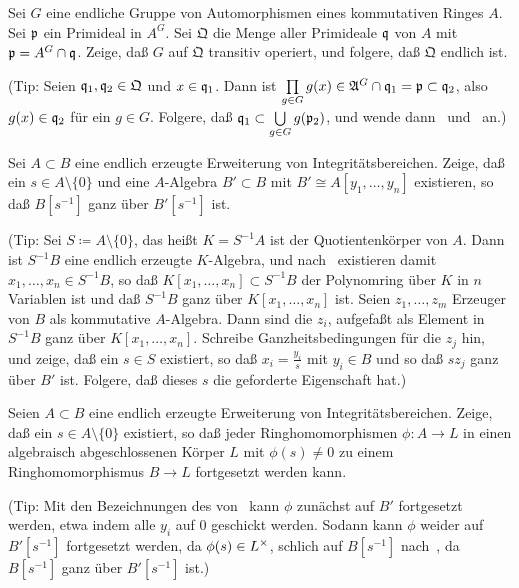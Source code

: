 \begin{exercise}
	Sei \(G\) eine endliche Gruppe von Automorphismen eines kommutativen Ringes
	\(A\). Sei \(\mathfrak{p}\) ein Primideal in \(A^G\). Sei \(\mathfrak Q\) die
	Menge aller Primideale \(\mathfrak{q}\) von \(A\) mit \(\mathfrak{p} = A^G \cap
	\mathfrak{q}\). Zeige, daß \(G\) auf \(\mathfrak Q\) transitiv operiert, und
	folgere, daß \(\mathfrak Q\) endlich ist.

	(Tip: Seien \(\mathfrak{q}_1, \mathfrak{q}_2 \in \mathfrak Q\) und \(x \in \mathfrak{q}_1\). Dann ist \(\prod\limits_{g \in G} g(x) \in \mathfrak{A}^G \cap \mathfrak{q}_1
	= \mathfrak{p} \subset \mathfrak{q}_2\), also \(g(x) \in \mathfrak{q}_2\) für ein
	\(g \in G\). Folgere, daß \(\mathfrak{q}_1 \subset \bigcup\limits_{g \in G}
	g(\mathfrak{p}_2)\), und wende dann~
	und~ an.)
\end{exercise}

\begin{exercise}
	\label{exer:global_noether_norm}
	Sei \(A \subset B\) eine endlich erzeugte Erweiterung von
	Integritätsbereichen. Zeige, daß ein \(s \in A \setminus \{0\}\) und eine
	\(A\)-Algebra \(B' \subset B\) mit \(B' \cong A[y_1, \dotsc, y_n]\)
	existieren, so daß \(B[s^{-1}]\) ganz über \(B'[s^{-1}]\) ist.
	
	(Tip: Sei \(S \coloneqq A \setminus \{0\}\), das heißt \(K = S^{-1} A\) ist
	der Quotientenkörper von \(A\). Dann ist \(S^{-1} B\) eine endlich erzeugte
	\(K\)-Algebra, und nach~ existieren damit
	\(x_1, \dotsc, x_n \in S^{-1} B\), so daß \(K[x_1, \dotsc, x_n] \subset
	S^{-1} B\) der Polynomring über \(K\) in \(n\) Variablen ist und daß
	\(S^{-1} B\) ganz über \(K[x_1, \dotsc, x_n]\) ist. Seien
	\(z_1, \dotsc, z_m\) Erzeuger von \(B\) als kommutative \(A\)-Algebra. Dann
	sind die \(z_i\), aufgefaßt als Element in \(S^{-1} B\) ganz über
	\(K[x_1, \dotsc, x_n]\). Schreibe Ganzheitsbedingungen für die \(z_j\) hin,
	und zeige, daß ein \(s \in S\) existiert, so daß \(x_i = \frac{y_i} s\)
	mit
	\(y_i \in B\) und so daß \(s z_j\) ganz über \(B'\) ist. Folgere, daß dieses
	\(s\) die geforderte Eigenschaft hat.)
\end{exercise}

\begin{exercise}
	\label{exer:global_extension_to_ac}
	Seien \(A \subset B\) eine endlich erzeugte Erweiterung von
	Integritätsbereichen. Zeige, daß ein \(s \in A \setminus \{0\}\) existiert,
	so daß jeder Ringhomomorphismen \(\phi\colon A \to L\) in einen algebraisch
	abgeschlossenen Körper \(L\) mit \(\phi(s) \neq 0\) zu einem
	Ringhomomorphismus \(B \to L\) fortgesetzt werden kann.
	
	(Tip: Mit den Bezeichnungen des
	von~ kann \(\phi\) zunächst auf
	\(B'\) fortgesetzt werden, etwa indem alle \(y_i\) auf \(0\) geschickt
	werden. Sodann kann \(\phi\) weider auf \(B'[s^{-1}]\) fortgesetzt werden,
	da \(\phi(s) \in L^\times\), schlich auf \(B[s^{-1}]\)
	nach~,
	da \(B[s^{-1}]\) ganz über \(B'[s^{-1}]\) ist.)
\end{exercise}

